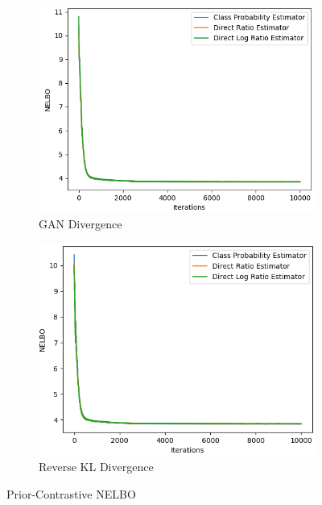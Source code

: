 \documentclass[honours,12pt]{unswthesis}
\numberwithin{equation}{section}
\theoremstyle{definition}
\begin{document}
\begin{figure}
\begin{subfigure}{0.49\textwidth}
\includegraphics[width=\linewidth]{nelbos/PCADVvsPCADVexpvsPCADVgudlog.png}
\caption{GAN Divergence}
\end{subfigure}
\begin{subfigure}{0.49\textwidth}
\includegraphics[width=\linewidth]{nelbos/PCKLDvsPCKLexpvsPCKLgudlog.png}
\caption{Reverse KL Divergence}
\end{subfigure}
\caption{Prior-Contrastive NELBO}
\end{figure}
\end{document}

